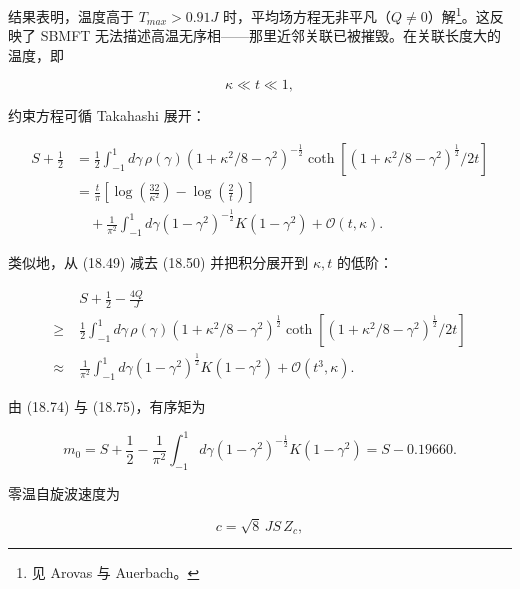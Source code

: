 结果表明，温度高于 $T_{max} > 0.91J$ 时，平均场方程无非平凡（$Q \neq 0$）解\footnote{见 Arovas 与 Auerbach。}。这反映了 SBMFT 无法描述高温无序相——那里近邻关联已被摧毁。在关联长度大的温度，即

\begin{equation*}
\kappa \ll t \ll 1 ,
\tag{18.82}
\end{equation*}

约束方程可循 Takahashi 展开：

\begin{align*}
S + \frac {1}{2} & = \frac {1}{2} \int_ {- 1} ^ {1} d \gamma \, \rho ( \gamma ) \left( 1 + \kappa^ {2} /8 - \gamma^ {2} \right) ^ {- \frac {1}{2}} \coth \left[ \left( 1 + \kappa^ {2} /8 - \gamma^ {2} \right) ^ {\frac {1}{2}} / 2t \right]\\
& = \frac {t}{\pi} \left[ \log \left( \frac {32}{\kappa^ {2}} \right) - \log \left( \frac {2}{t} \right) \right]\\
& \quad + \frac {1}{\pi^ {2}} \int_ {- 1} ^ {1} d \gamma \left( 1 - \gamma^ {2} \right) ^ {- \frac {1}{2}} K \left( 1 - \gamma^ {2} \right) + \mathcal {O} ( t, \kappa ) .
\tag{18.83}
\end{align*}

类似地，从 (18.49) 减去 (18.50) 并把积分展开到 $\kappa, t$ 的低阶：

\begin{align*}
& S + \frac {1}{2} - \frac {4 Q}{J}\\
\geq \; & \frac {1}{2} \int_ {- 1} ^ {1} d \gamma \, \rho ( \gamma ) \left( 1 + \kappa^ {2} /8 - \gamma^ {2} \right) ^ {\frac {1}{2}} \coth \left[ \left( 1 + \kappa^ {2} /8 - \gamma^ {2} \right) ^ {\frac {1}{2}} / 2t \right]\\
\approx \; & \frac {1}{\pi^ {2}} \int_ {- 1} ^ {1} d \gamma \left( 1 - \gamma^ {2} \right) ^ {\frac {1}{2}} K \left( 1 - \gamma^ {2} \right) + \mathcal {O} ( t ^ {3}, \kappa ) .
\tag{18.84}
\end{align*}

由 (18.74) 与 (18.75)，有序矩为

\begin{equation*}
m _ {0} = S + \frac {1}{2} - \frac {1}{\pi^ {2}} \int_ {- 1} ^ {1} d \gamma \left( 1 - \gamma^ {2} \right) ^ {- \frac {1}{2}} K \left( 1 - \gamma^ {2} \right) = S - 0.19660.
\tag{18.85}
\end{equation*}

零温自旋波速度为

\begin{equation*}
c = \sqrt {8} \, J S \, Z _ {c} ,
\tag{18.86}
\end{equation*}

